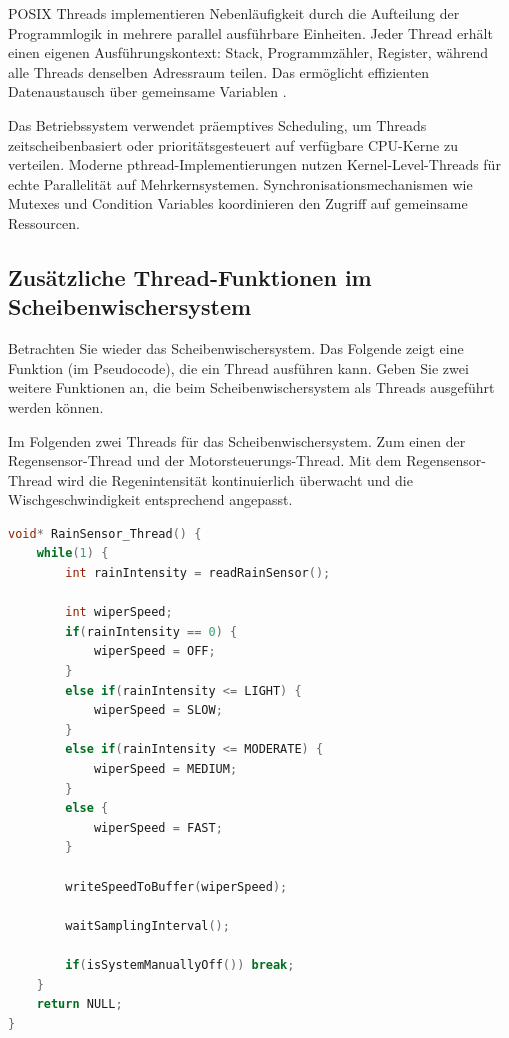 \documentclass[
%
ngerman %
%
numeric %
]{wbh-assignment}
\begin{document}
\vspace*{5mm}

POSIX Threads implementieren Nebenläufigkeit durch die Aufteilung der Programmlogik in mehrere parallel ausführbare Einheiten.
Jeder Thread erhält einen eigenen Ausführungskontext: Stack, Programmzähler, Register, während alle Threads denselben Adressraum teilen.
Das ermöglicht effizienten Datenaustausch über gemeinsame Variablen \cite{LinuxTutorialPOSIX}.

Das Betriebssystem verwendet präemptives Scheduling, um Threads zeitscheibenbasiert oder prioritätsgesteuert auf verfügbare CPU-Kerne zu verteilen.
Moderne pthread-Implementierungen nutzen Kernel-Level-Threads für echte Parallelität auf Mehrkernsystemen.
Synchronisationsmechanismen wie Mutexes und Condition Variables koordinieren den Zugriff auf gemeinsame Ressourcen.

\newpage

\subsection{Zusätzliche Thread-Funktionen im Scheibenwischersystem}
\begin{aufgabenstellung}
Betrachten Sie wieder das Scheibenwischersystem. Das Folgende zeigt eine Funktion (im Pseudocode), die ein Thread ausführen kann.
Geben Sie zwei weitere Funktionen an, die beim Scheibenwischersystem als Threads ausgeführt werden können.
\end{aufgabenstellung}

\vspace*{5mm}

Im Folgenden zwei Threads für das Scheibenwischersystem. Zum einen der Regensensor-Thread und der Motorsteuerungs-Thread. \newline
Mit dem Regensensor-Thread wird die Regenintensität kontinuierlich überwacht und die Wischgeschwindigkeit entsprechend angepasst.

\vspace*{5mm}

\begin{lstlisting}[language=C, caption={Regensensor-Thread}]
void* RainSensor_Thread() {
    while(1) {
        int rainIntensity = readRainSensor();

        int wiperSpeed;
        if(rainIntensity == 0) {
            wiperSpeed = OFF;
        }
        else if(rainIntensity <= LIGHT) {
            wiperSpeed = SLOW;
        }
        else if(rainIntensity <= MODERATE) {
            wiperSpeed = MEDIUM;
        }
        else {
            wiperSpeed = FAST;
        }

        writeSpeedToBuffer(wiperSpeed);

        waitSamplingInterval();

        if(isSystemManuallyOff()) break;
    }
    return NULL;
}
\end{lstlisting}
\end{document}
